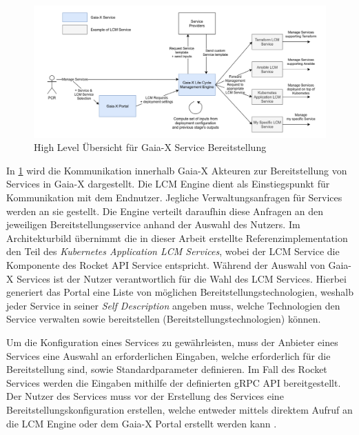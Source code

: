 \begin{figure}
  \centering
  \includegraphics[width=\textwidth]{gfx/chapters/4_gaia-X/orchestration_overview.png}
  \caption{High Level Übersicht für Gaia-X Service Bereitstellung}
  \label{fig:gaia-x-orchestration-overview}
\end{figure}

In \ref{fig:gaia-x-orchestration-overview} wird die Kommunikation innerhalb Gaia-X Akteuren 
zur Bereitstellung von Services in Gaia-X dargestellt.  
Die \ac{LCM} Engine dient als Einstiegspunkt für Kommunikation mit dem Endnutzer. Jegliche Verwaltungsanfragen
für Services werden an sie gestellt. Die Engine verteilt daraufhin diese Anfragen 
an den jeweiligen Bereitstellungsservice anhand der Auswahl des Nutzers.
Im Architekturbild übernimmt die in dieser Arbeit erstellte Referenzimplementation 
den Teil des \emph{Kubernetes Application LCM Services}, wobei der \ac{LCM} Service die 
Komponente des Rocket API Service entspricht.
Während der Auswahl von Gaia-X Services ist der Nutzer verantwortlich für die Wahl des \ac{LCM} Services.
Hierbei generiert das Portal eine Liste von möglichen Bereitstellungstechnologien,
weshalb jeder Service in seiner \emph{Self Description} angeben muss, welche Technologien den Service
verwalten sowie bereitstellen (Bereitstellungstechnologien) können.

Um die Konfiguration eines Services zu gewährleisten, muss der Anbieter eines Services eine Auswahl
an erforderlichen Eingaben, welche erforderlich für die Bereitstellung sind, sowie Standardparameter definieren.
Im Fall des Rocket Services werden die Eingaben mithilfe der definierten gRPC API bereitgestellt.
Der Nutzer des Services muss vor der Erstellung des Services eine Bereitstellungskonfiguration erstellen,
welche entweder mittels direktem Aufruf an die \ac{LCM} Engine oder dem Gaia-X Portal erstellt werden kann \cite{ORC2021}.

